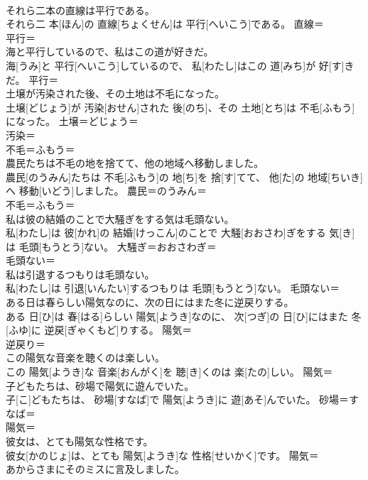 \documentclass[8pt]{extreport}
\begin{document}
\begin{CJK}{UTF8}{min}
\\	それら二本の直線は平行である。	
\\	それら二 本[ほん]の 直線[ちょくせん]は 平行[へいこう]である。	直線＝ 
\\	平行＝ 
\\	海と平行しているので、私はこの道が好きだ。	
\\	海[うみ]と 平行[へいこう]しているので、 私[わたし]はこの 道[みち]が 好[す]きだ。	平行＝ 
\\	土壌が汚染された後、その土地は不毛になった。	
\\	土壌[どじょう]が 汚染[おせん]された 後[のち]、その 土地[とち]は 不毛[ふもう]になった。	土壌＝どじょう＝ 
\\	汚染＝ 
\\	不毛＝ふもう＝ 
\\	農民たちは不毛の地を捨てて、他の地域へ移動しました。	
\\	農民[のうみん]たちは 不毛[ふもう]の 地[ち]を 捨[す]てて、 他[た]の 地域[ちいき]へ 移動[いどう]しました。	農民＝のうみん＝ 
\\	不毛＝ふもう＝ 
\\	私は彼の結婚のことで大騒ぎをする気は毛頭ない。	
\\	私[わたし]は 彼[かれ]の 結婚[けっこん]のことで 大騒[おおさわ]ぎをする 気[き]は 毛頭[もうとう]ない。	大騒ぎ＝おおさわぎ＝ 
\\	毛頭ない＝ 
\\	私は引退するつもりは毛頭ない。	
\\	私[わたし]は 引退[いんたい]するつもりは 毛頭[もうとう]ない。	毛頭ない＝ 
\\	ある日は春らしい陽気なのに、次の日にはまた冬に逆戻りする。	
\\	ある 日[ひ]は 春[はる]らしい 陽気[ようき]なのに、 次[つぎ]の 日[ひ]にはまた 冬[ふゆ]に 逆戻[ぎゃくもど]りする。	陽気＝ 
\\	逆戻り＝
\\	この陽気な音楽を聴くのは楽しい。	
\\	この 陽気[ようき]な 音楽[おんがく]を 聴[き]くのは 楽[たの]しい。	陽気＝ 
\\	子どもたちは、砂場で陽気に遊んでいた。	
\\	子[こ]どもたちは、 砂場[すなば]で 陽気[ようき]に 遊[あそ]んでいた。	砂場＝すなば＝ 
\\	陽気＝ 
\\	彼女は、とても陽気な性格です。	
\\	彼女[かのじょ]は、とても 陽気[ようき]な 性格[せいかく]です。	陽気＝ 
\\	あからさまにそのミスに言及しました。	

\end{CJK}
\end{document}
